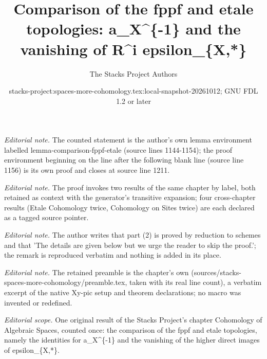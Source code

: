 \documentclass{stacks-project}
\title{Comparison of the fppf and etale topologies: a\_X\textasciicircum{}\{-1\} and the vanishing of R\textasciicircum{}i epsilon\_\{X,*\}}
\author{The Stacks Project Authors}
\date{stacks-project:spaces-more-cohomology.tex:local-snapshot-20261012; GNU FDL 1.2 or later}
\theoremstyle{plain}
\theoremstyle{definition}
\theoremstyle{remark}
\numberwithin{equation}{subsection}
\begin{document}
\maketitle
\noindent\textit{Editorial note.} The counted statement is the author's own lemma environment labelled lemma-comparison-fppf-etale (source lines 1144-1154); the proof environment beginning on the line after the following blank line (source line 1156) is its own proof and closes at source line 1211.\par\medskip
\noindent\textit{Editorial note.} The proof invokes two results of the same chapter by label, both retained as context with the generator's transitive expansion; four cross-chapter results (Etale Cohomology twice, Cohomology on Sites twice) are each declared as a tagged source pointer.\par\medskip
\noindent\textit{Editorial note.} The author writes that part (2) is proved by reduction to schemes and that 'The details are given below but we urge the reader to skip the proof.'; the remark is reproduced verbatim and nothing is added in its place.\par\medskip
\noindent\textit{Editorial note.} The retained preamble is the chapter's own (sources/stacks-spaces-more-cohomology/preamble.tex, taken with its real line count), a verbatim excerpt of the native Xy-pic setup and theorem declarations; no macro was invented or redefined.\par\medskip
\noindent\textit{Editorial scope.} One original result of the Stacks Project's chapter Cohomology of Algebraic Spaces, counted once: the comparison of the fppf and etale topologies, namely the identities for a\_X\textasciicircum{}\{-1\} and the vanishing of the higher direct images of epsilon\_\{X,*\}.\par\medskip
\end{document}
